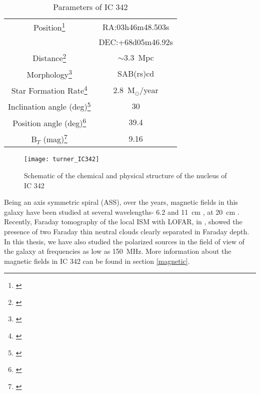 \documentclass[../main/thesis_msc.tex]{subfiles}
\begin{document}
\begin{table}[t]
        \centering
        \begin{tabular}{cc}
            \hline\hline
            Position\footnote{\citep{ic342_position}} & RA:03h46m48.503s\\ 
                     & DEC:+68d05m46.92s\\
            Distance\footnote{\citep{distance_ic342}} & $\sim$3.3~Mpc\\
            Morphology\footnote{\citep{morphology}} & SAB(rs)cd\\
            Star Formation Rate\footnote{\citep{SFR}} & 2.8~M$_\odot$/year\\
            Inclination angle (deg)\footnote{\citep{H1}} & 30 \\
            Position angle (deg)\footnote{\citep{H1}} & 39.4 \\
            B$_T$ (mag)\footnote{\citep{nobody_cares}} & 9.16 \\
             \bottomrule
        \end{tabular}
        \caption{Parameters of IC 342}
        \label{ic342_intro}
    \end{table}
\begin{figure}[h]
\centering
\texttt{[image: turner\_IC342]}
\caption{Schematic of the chemical and physical structure of the nucleus of IC 342\citep{ic342_4}}
\label{swr}
\end{figure}

Being an axis symmetric spiral (ASS), over the years, magnetic fields in this galaxy have been studied at several wavelengths- 6.2 and 11~cm \citep{grave}, at 20~cm \citep{ic342_20}. Recently, Faraday tomography of the local ISM with LOFAR, in \citep{ic342_5}, showed the presence of two Faraday thin neutral clouds clearly separated in Faraday depth.  In this thesis, we have also studied the polarized sources in the field of view of the galaxy at frequencies as low as 150~MHz. More information about the magnetic fields in IC 342 can be found in section \ref{magnetic}.
\end{document}
